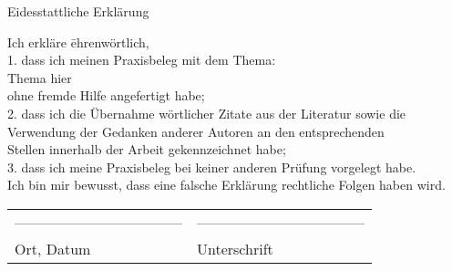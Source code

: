 

\cleardoublepage 
{}

	\begin{titlepage}
	
	
		\begin{bfseries}
			\begin{center}
				\Huge{Eidesstattliche Erklärung}\\[3cm]
			\end{center}
		\end{bfseries}
		
		\begin{tabbing}
		Ich erkläre \= ehrenwörtlich,\\[1cm]
		1. 	\> dass ich meinen Praxisbeleg mit dem Thema:\\[1cm]
		   	\> Thema hier\\[1cm]
		ohne fremde Hilfe angefertigt habe;\\[1cm]
		
		2.	\> dass ich die Übernahme wörtlicher Zitate aus der Literatur sowie die\\ 		  
			\>Verwendung der Gedanken anderer Autoren an den entsprechenden\\
			\> Stellen innerhalb der Arbeit gekennzeichnet habe;\\[0.5cm]
		
		3.	\> dass ich meine Praxisbeleg bei keiner anderen Prüfung vorgelegt habe. \\[1cm]
		Ich bin mir bewusst, dass eine falsche Erklärung rechtliche Folgen haben wird. \\[2cm]
		\end{tabbing}
		
		 \begin{tabular}{p{8cm}l}
		  ----------------------------------- &  ----------------------------------- \\
		  Ort, Datum & Unterschrift  \\
		 \end{tabular}
	\end{titlepage}